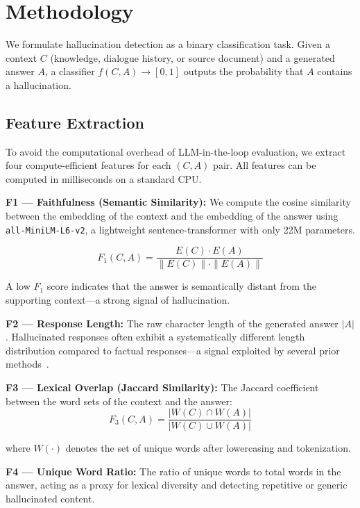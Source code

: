 \documentclass[conference]{IEEEtran}
\begin{document}
\section{Methodology}

We formulate hallucination detection as a binary classification task. Given a context $C$ (knowledge, dialogue history, or source document) and a generated answer $A$, a classifier $f(C, A) \rightarrow [0,1]$ outputs the probability that $A$ contains a hallucination.

\subsection{Feature Extraction}

To avoid the computational overhead of LLM-in-the-loop evaluation, we extract four compute-efficient features for each $(C, A)$ pair. All features can be computed in milliseconds on a standard CPU.

\textbf{F1 — Faithfulness (Semantic Similarity):} We compute the cosine similarity between the embedding of the context and the embedding of the answer using \texttt{all-MiniLM-L6-v2}, a lightweight sentence-transformer with only 22M parameters.

\begin{equation}
F_1(C, A) = \frac{E(C) \cdot E(A)}{\|E(C)\| \cdot \|E(A)\|}
\end{equation}

A low $F_1$ score indicates that the answer is semantically distant from the supporting context—a strong signal of hallucination.

\textbf{F2 — Response Length:} The raw character length of the generated answer $|A|$. Hallucinated responses often exhibit a systematically different length distribution compared to factual responses—a signal exploited by several prior methods~\cite{manakul2023selfcheck}.

\textbf{F3 — Lexical Overlap (Jaccard Similarity):} The Jaccard coefficient between the word sets of the context and the answer:
\begin{equation}
F_3(C, A) = \frac{|W(C) \cap W(A)|}{|W(C) \cup W(A)|}
\end{equation}

where $W(\cdot)$ denotes the set of unique words after lowercasing and tokenization.

\textbf{F4 — Unique Word Ratio:} The ratio of unique words to total words in the answer, acting as a proxy for lexical diversity and detecting repetitive or generic hallucinated content.
\end{document}

